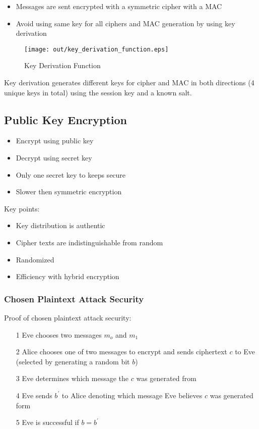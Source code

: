 \documentclass[a4paper]{article}
\begin{document}
\begin{itemize}
  \item Messages are sent encrypted with a symmetric cipher with a MAC
  \item Avoid using same key for all ciphers and MAC generation by using key
        derivation
\end{itemize}

\begin{figure}[h!]
  \centering
  \texttt{[image: out/key\_derivation\_function.eps]}
  \caption{Key Derivation Function}
  \label{fig:key_derivation_function}
\end{figure}
\FloatBarrier

Key derivation generates different keys for cipher and MAC in both directions (4
unique keys in total) using the session key and a known salt.

\subsection{Public Key Encryption}

\begin{itemize}
  \item Encrypt using public key
  \item Decrypt using secret key
  \item Only one secret key to keeps secure
  \item Slower then symmetric encryption
\end{itemize}

Key points:
\begin{itemize}
  \item Key distribution is authentic
  \item Cipher texts are indistinguishable from random
  \item Randomized
  \item Efficiency with hybrid encryption
\end{itemize}

\subsubsection{Chosen Plaintext Attack Security}

Proof of chosen plaintext attack security:
\begin{enumerate}
  \item[1] Eve chooses two messages $m_{o}$ and $m_{1}$
  \item[2] Alice chooses one of two messages to encrypt and sends ciphertext $c$
           to Eve (selected by generating a random bit $b$)
  \item[3] Eve determines which message the $c$ was generated from
  \item[4] Eve sends $b^{\prime}$ to Alice denoting which message Eve believes
           $c$ was generated form
  \item[5] Eve is successful if $b = b^{\prime}$
\end{enumerate}
\end{document}
